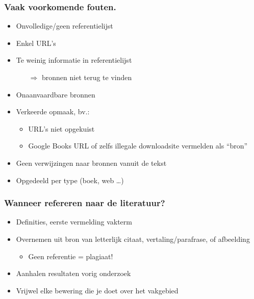 \documentclass[aspectratio=169]{beamer}
\begin{document}
\begin{frame}
  \frametitle{Vaak voorkomende fouten.}

  \begin{itemize}
    \item Onvolledige/geen referentielijst
    \item Enkel URL's
    \item Te weinig informatie in referentielijst
          \begin{itemize}
            \item[$\Rightarrow$] bronnen niet terug te vinden
          \end{itemize}
    \item Onaanvaardbare bronnen
    \item Verkeerde opmaak, bv.:
          \begin{itemize}
            \item URL's niet opgekuist
            \item Google Books URL of zelfs illegale downloadsite vermelden als ``bron''
          \end{itemize}
    \item Geen verwijzingen naar bronnen vanuit de tekst
    \item Opgedeeld per type (boek, web \ldots)
  \end{itemize}
\end{frame}

\begin{frame}
  \frametitle{Wanneer refereren naar de literatuur?}

  \begin{itemize}
    \item Definities, eerste vermelding vakterm
    \item Overnemen uit bron van letterlijk citaat, vertaling/parafrase, of afbeelding
          \begin{itemize}
            \item Geen referentie = \alert{plagiaat!}
          \end{itemize}
    \item Aanhalen resultaten vorig onderzoek
    \item Vrijwel elke bewering die je doet over het vakgebied
  \end{itemize}

  \bigskip

\end{frame}
\end{document}
